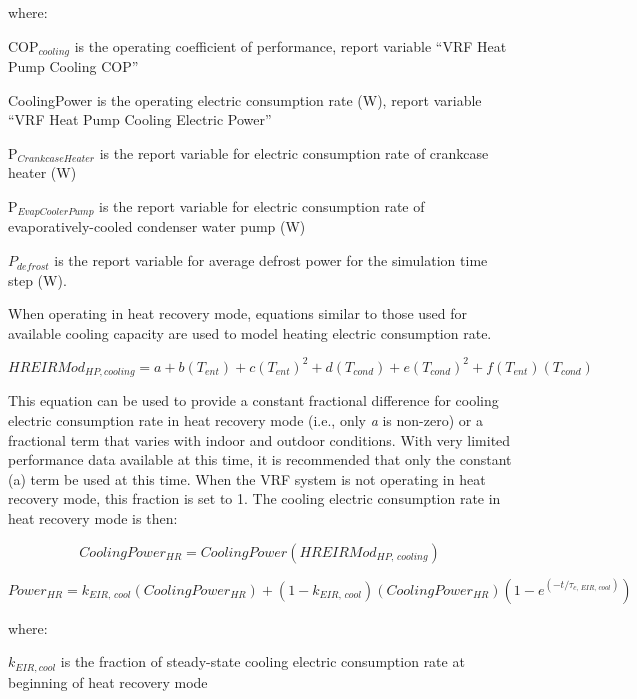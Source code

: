 where:

COP\(_{cooling}\) is the operating coefficient of performance, report variable ``VRF Heat Pump Cooling COP''

CoolingPower is the operating electric consumption rate (W), report variable ``VRF Heat Pump Cooling Electric Power''

P\(_{CrankcaseHeater}\) is the report variable for electric consumption rate of crankcase heater (W)

P\(_{EvapCoolerPump}\) is the report variable for electric consumption rate of evaporatively-cooled condenser water pump (W)

\({P_{defrost}}\) is the report variable for average defrost power for the simulation time step (W).

When operating in heat recovery mode, equations similar to those used for available cooling capacity are used to model heating electric consumption rate.

\begin{equation}
  HREIRMod_{HP,cooling} = a + b \left( T_{ent} \right) + c \left( T_{ent} \right)^2 + d \left( T_{cond} \right) + e \left( T_{cond} \right)^2 + f \left( T_{ent} \right) \left( T_{cond} \right)
\end{equation}

This equation can be used to provide a constant fractional difference for cooling electric consumption rate in heat recovery mode (i.e., only \emph{a} is non-zero) or a fractional term that varies with indoor and outdoor conditions. With very limited performance data available at this time, it is recommended that only the constant (a) term be used at this time. When the VRF system is not operating in heat recovery mode, this fraction is set to 1. The cooling electric consumption rate in heat recovery mode is then:

\begin{equation}
  CoolingPower_{HR} = CoolingPower \left( HREIRMod_{HP,\,cooling} \right)
\end{equation}

\begin{equation}
  Power_{HR} = k_{EIR,\,cool} \left( CoolingPower_{HR} \right) + \left( 1 - k_{EIR,\,cool} \right) \left( CoolingPower_{HR} \right) \left( 1 - e^{\left( -t / \tau_{c,\,EIR,\,cool} \right)} \right)
\end{equation}
  
where:

\(k_{EIR,cool}\) is the fraction of steady-state cooling electric consumption rate at beginning of heat recovery mode

